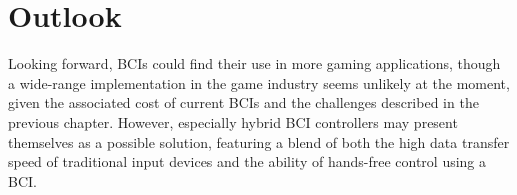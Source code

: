 \chapter{Outlook}
\label{chap:outlook}

Looking forward, BCIs could find their use in more gaming applications, though a wide-range implementation in the game industry seems unlikely at the moment, given the associated cost of current BCIs and the challenges described in the previous chapter. 
However, especially hybrid BCI controllers may present themselves as a possible solution, featuring a blend of both the high data transfer speed of traditional input devices and the ability of hands-free control using a BCI. 

